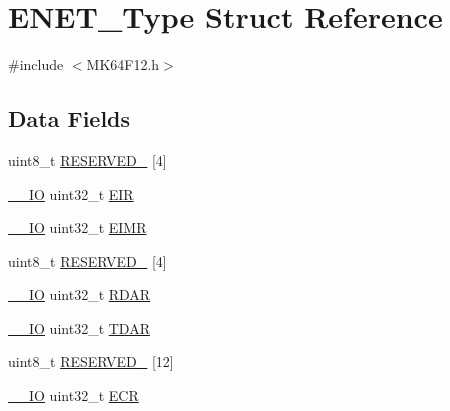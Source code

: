 \hypertarget{struct_e_n_e_t___type}{}\section{E\+N\+E\+T\+\_\+\+Type Struct Reference}
\label{struct_e_n_e_t___type}


{\ttfamily \#include $<$M\+K64\+F12.\+h$>$}

\subsection*{Data Fields}
\begin{DoxyCompactItemize}
\item 
uint8\+\_\+t \mbox{\hyperlink{group___v_r_e_f___peripheral___access___layer_ga71277aaa40be4473ac2521981f273bd3}{R\+E\+S\+E\+R\+V\+E\+D\+\_}} \mbox{[}4\mbox{]}
\item 
\mbox{\hyperlink{core__cm4_8h_aec43007d9998a0a0e01faede4133d6be}{\+\_\+\+\_\+\+IO}} uint32\+\_\+t \mbox{\hyperlink{group___v_r_e_f___peripheral___access___layer_ga05ae409ff16cdfb67db7da884bc754fe}{E\+IR}}
\item 
\mbox{\hyperlink{core__cm4_8h_aec43007d9998a0a0e01faede4133d6be}{\+\_\+\+\_\+\+IO}} uint32\+\_\+t \mbox{\hyperlink{group___v_r_e_f___peripheral___access___layer_ga04e3f6ea5af8954c66abd2a6a8b267c8}{E\+I\+MR}}
\item 
uint8\+\_\+t \mbox{\hyperlink{group___v_r_e_f___peripheral___access___layer_ga422ac2beba1cc5c797380d1c5832b885}{R\+E\+S\+E\+R\+V\+E\+D\+\_}} \mbox{[}4\mbox{]}
\item 
\mbox{\hyperlink{core__cm4_8h_aec43007d9998a0a0e01faede4133d6be}{\+\_\+\+\_\+\+IO}} uint32\+\_\+t \mbox{\hyperlink{group___v_r_e_f___peripheral___access___layer_ga599e1eea91be0c79d3cae22017eaab71}{R\+D\+AR}}
\item 
\mbox{\hyperlink{core__cm4_8h_aec43007d9998a0a0e01faede4133d6be}{\+\_\+\+\_\+\+IO}} uint32\+\_\+t \mbox{\hyperlink{group___v_r_e_f___peripheral___access___layer_gadf43b4fab7d23c0ec0460a909c0f7c17}{T\+D\+AR}}
\item 
uint8\+\_\+t \mbox{\hyperlink{group___v_r_e_f___peripheral___access___layer_ga2e60525cb6cf392df908d0e076003558}{R\+E\+S\+E\+R\+V\+E\+D\+\_}} \mbox{[}12\mbox{]}
\item 
\mbox{\hyperlink{core__cm4_8h_aec43007d9998a0a0e01faede4133d6be}{\+\_\+\+\_\+\+IO}} uint32\+\_\+t \mbox{\hyperlink{group___v_r_e_f___peripheral___access___layer_ga1c146954c72b1cc2c05a85dd55ae5c9b}{E\+CR}}

\end{DoxyCompactItemize}
